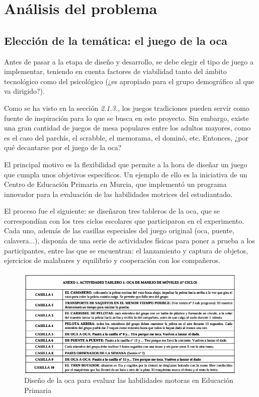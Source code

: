\section{Análisis del problema}

\subsection{Elección de la temática: el juego de la oca}

Antes de pasar a la etapa de diseño y desarrollo, se debe elegir el tipo de juego a implementar, teniendo en cuenta factores de viabilidad tanto del ámbito tecnológico como del psicológico (¿es apropiado para el grupo demográfico al que va dirigido?).

Como se ha visto en la sección \textit{2.1.3.}, los juegos tradiciones pueden servir como fuente de inspiración para lo que se busca en este proyecto. Sin embargo, existe una gran cantidad de juegos de mesa populares entre los adultos mayores, como es el caso del parchís, el scrabble, el memorama, el dominó, etc. Entonces, ¿por qué decantarse por el juego de la oca?

El principal motivo es la flexibilidad que permite a la hora de diseñar un juego que cumpla unos objetivos específicos. Un ejemplo de ello es la iniciativa de un Centro de Educación Primaria en Murcia, que implementó un programa innovador para la evaluación de las habilidades motrices del estudiantado. \parencite{experienciaOca}

El proceso fue el siguiente: se diseñaron tres tableros de la oca, que se correspondían con los tres ciclos escolares que participaron en el experimento. Cada uno, además de las casillas especiales del juego original (oca, puente, calavera...), disponía de una serie de actividades físicas para poner a prueba a los participantes, entre las que se encuentran: el lanzamiento y captura de objetos, ejercicios de malabares y equilibrio y cooperación con los compañeros.

\begin{figure}[h]
	\centering
	\includegraphics[width=1\textwidth]{imgs/casillas-oca-primaria.JPG}
	\caption{Diseño de la oca para evaluar las habilidades motoras en Educación Primaria \parencite{experienciaOca}}
	\label{fig:casillas-oca-primaria}
\end{figure}

